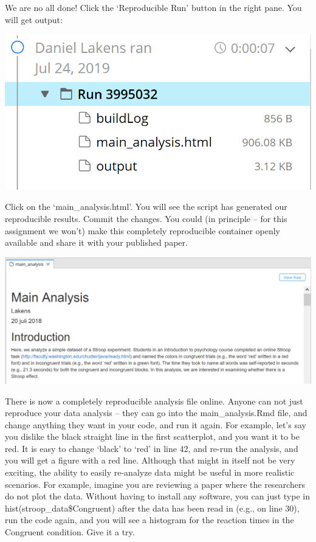 \documentclass[
  oneside]{book}
\begin{document}
We are no all done! Click the `Reproducible Run' button in the right pane. You
will get output:

\begin{center}\includegraphics[width=1\linewidth]{images/6c4278d56ff2d9101052c74a61783b43} \end{center}

Click on the `main\_analysis.html'. You will see the script has generated our
reproducible results. Commit the changes. You could (in principle -- for this
assignment we won't) make this completely reproducible container openly
available and share it with your published paper.

\begin{center}\includegraphics[width=1\linewidth]{images/f8904ae8e964bd88b2c21078ea9e81f9} \end{center}

There is now a completely reproducible analysis file online. Anyone can not just
reproduce your data analysis -- they can go into the main\_analysis.Rmd file, and
change anything they want in your code, and run it again. For example, let's say
you dislike the black straight line in the first scatterplot, and you want it to
be red. It is easy to change `black' to `red' in line 42, and re-run the
analysis, and you will get a figure with a red line. Although that might in
itself not be very exciting, the ability to easily re-analyze data might be
useful in more realistic scenarios. For example, imagine you are reviewing a
paper where the researchers do not plot the data. Without having to install any
software, you can just type in hist(stroop\_data\$Congruent) after the data has
been read in (e.g., on line 30), run the code again, and you will see a
histogram for the reaction times in the Congruent condition. Give it a try.
\end{document}
